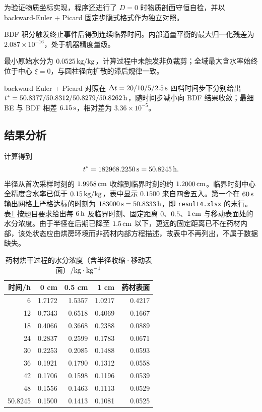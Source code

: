 \documentclass[UTF8,a4paper,12pt]{ctexart}
\begin{document}
为验证物质坐标实现，程序还进行了 $D=0$ 时物质剖面守恒自检，并以 backward-Euler + Picard 固定步隐式格式作为独立对照。

BDF 积分触发终止事件后得到连续临界时间。内部通量平衡的最大归一化残差为 $2.087\times10^{-16}$，处于机器精度量级。

最小原始水分为 $0.0525\rm\,kg/kg$，计算过程中未触发非负裁剪；全域最大含水率始终位于中心 $\xi=0$，与圆柱径向扩散的滞后规律一致。

backward-Euler + Picard 对照在 $\Delta t=20/10/5/2.5\rm\,s$ 四档时间步下分别给出 $t^*=50.8377/50.8312/50.8279/50.8262\rm\,h$，随时间步减小向 BDF 结果收敛；最细 BE 与 BDF 相差 $6.15\rm\,s$，相对差为 $3.36\times10^{-5}$。

\subsection{结果分析}
计算得到
\begin{equation}
  t^*=182968.2250\rm\,s=50.8245\rm\,h.
\end{equation}
半径从首次采样时刻的 $1.9958\rm\,cm$ 收缩到临界时刻的约 $1.2000\rm\,cm$。临界时刻中心全精度含水率已低于 $0.15\rm\,kg/kg$，表中显示 $0.1500$ 来自四舍五入。第一个在 $60\rm\,s$ 输出网格上严格达标的时刻为 $183000\rm\,s=50.8333\rm\,h$，即 \texttt{result4.xlsx} 的末行。表\ref{tab:q4-moist} 按题目要求给出每 $6\rm\,h$ 及临界时刻、固定距离 $0$、$0.5$、$1\rm\,cm$ 与移动表面处的水分浓度。由于半径在后期已降至 $1.5\rm\,cm$ 以下，更远的固定距离已不在药材内部，该处状态应由烘房环境而非药材内部方程描述，故表中不再列出，不属于数据缺失。

\begin{table}[H]
  \centering
  \caption{药材烘干过程的水分浓度（含半径收缩·移动表面）$/\rm kg\cdot kg^{-1}$}
  \label{tab:q4-moist}
  \begin{tabular}{rrrrr}
    \toprule
    时间/h & 0 cm & 0.5 cm & 1 cm & 药材表面\\ \midrule
    6 & 1.7172 & 1.5357 & 1.0217 & 0.4217\\
    12 & 0.7343 & 0.6518 & 0.4069 & 0.1667\\
    18 & 0.4066 & 0.3668 & 0.2388 & 0.0889\\
    24 & 0.2837 & 0.2599 & 0.1783 & 0.0671\\
    30 & 0.2253 & 0.2085 & 0.1488 & 0.0593\\
    36 & 0.1921 & 0.1790 & 0.1312 & 0.0558\\
    42 & 0.1706 & 0.1598 & 0.1196 & 0.0539\\
    48 & 0.1556 & 0.1463 & 0.1113 & 0.0529\\
    50.8245 & 0.1500 & 0.1413 & 0.1081 & 0.0525\\
    \bottomrule
  \end{tabular}
\end{table}
\end{document}
